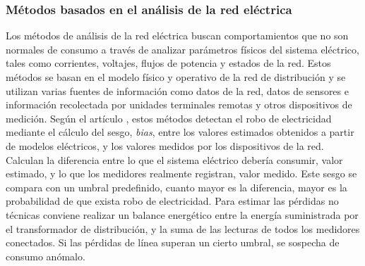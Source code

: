 \documentclass[12pt,a4paper]{report}
\begin{document}
\subsubsection{Métodos basados en el análisis de la red eléctrica}

Los métodos de análisis de la red eléctrica buscan comportamientos que no son normales de consumo a través de analizar parámetros físicos del sistema eléctrico, tales como corrientes, voltajes, flujos de potencia y estados de la red. Estos métodos se basan en el modelo físico y operativo de la red de distribución y se utilizan varias fuentes de información como datos de la red, datos de sensores e información recolectada por unidades terminales remotas y otros dispositivos de medición. Según el artículo \cite{articuloAnálisisRedEléctrica}, estos métodos detectan el robo de electricidad mediante el cálculo del sesgo, \emph{bias}, entre los valores estimados obtenidos a partir de modelos eléctricos, y los valores medidos por los dispositivos de la red. Calculan la diferencia entre lo que el sistema eléctrico debería consumir, valor estimado, y lo que los medidores realmente registran, valor medido. Este sesgo se compara con un umbral predefinido, cuanto mayor es la diferencia, mayor es la probabilidad de que exista robo de electricidad. Para estimar las pérdidas no técnicas conviene realizar un balance energético entre la energía suministrada por el transformador de distribución, y la suma de las lecturas de todos los medidores conectados. Si las pérdidas de línea superan un cierto umbral, se sospecha de consumo anómalo.
\end{document}
